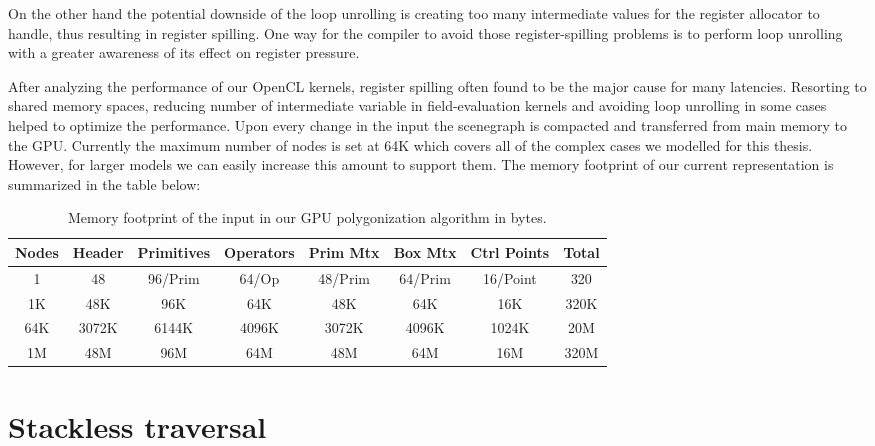 On the other hand the potential downside of the loop unrolling is creating too many intermediate values for the register allocator to handle, thus resulting in 
register spilling. One way for the compiler to avoid those register-spilling problems is to perform loop unrolling with a greater awareness of its effect on register 
pressure. 

After analyzing the performance of our OpenCL kernels, register spilling often found to be the major cause for many latencies. Resorting to shared memory spaces, reducing 
number of intermediate variable in field-evaluation kernels and avoiding loop unrolling in some cases helped to optimize the performance. Upon every
change in the input \blob the scenegraph is compacted and transferred from main memory to the GPU. Currently the maximum number of nodes is set at 64K which covers
all of the complex cases we modelled for this thesis. However, for larger \blob models  we can easily increase this amount to support them. The memory footprint of 
our current \blob representation is summarized in the table below:

\begin{table}[H]
\begin{center}
	 \caption{\label{table:memfootprint}
  {Memory footprint of the input \blob in our GPU polygonization algorithm in bytes.}
}
  \begin{tabular}{ | c | c | c | c | c | c | c | c |}
    \hline    
    Nodes & Header & Primitives & Operators & Prim Mtx & Box Mtx & Ctrl Points & Total \\ \hline \hline
    1 & 48 & 96/Prim & 64/Op & 48/Prim & 64/Prim & 16/Point & 320 \\ \hline
    1K & 48K & 96K & 64K & 48K & 64K & 16K & 320K \\ \hline
    64K & 3072K & 6144K & 4096K & 3072K & 4096K & 1024K & 20M \\ \hline
    1M & 48M & 96M & 64M & 48M & 64M & 16M & 320M \\ 
    \hline
  	\end{tabular}
\end{center}
\end{table}


\section{Stackless \blob traversal}

